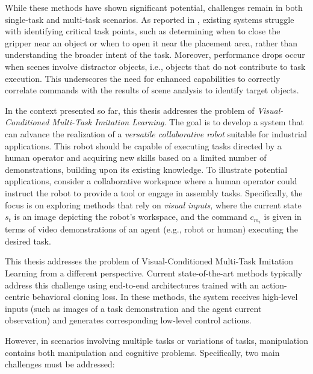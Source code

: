 While these methods have shown significant potential, challenges remain in both single-task and multi-task scenarios. As reported in \cite{jang2022bc_z, yu2018daml}, existing systems struggle with identifying critical task points, such as determining when to close the gripper near an object or when to open it near the placement area, rather than understanding the broader intent of the task. Moreover, performance drops occur when scenes involve distractor objects, i.e., objects that do not contribute to task execution. This underscores the need for enhanced capabilities to correctly correlate commands with the results of scene analysis to identify target objects.

In the context presented so far, this thesis addresses the problem of \textit{Visual-Conditioned Multi-Task Imitation Learning}. The goal is to develop a system that can advance the realization of a \textit{versatile collaborative robot} suitable for industrial applications. This robot should be capable of executing tasks directed by a human operator and acquiring new skills based on a limited number of demonstrations, building upon its existing knowledge. To illustrate potential applications, consider a collaborative workspace where a human operator could instruct the robot to provide a tool or engage in assembly tasks. Specifically, the focus is on exploring methods that rely on \textit{visual inputs}, where the current state $s_{t}$ is an image depicting the robot's workspace, and the command $c_{m_{i}}$ is given in terms of video demonstrations of an agent (e.g., robot or human) executing the desired task.

This thesis addresses the problem of Visual-Conditioned Multi-Task Imitation Learning from a different perspective. Current state-of-the-art methods typically address this challenge using end-to-end architectures trained with an action-centric behavioral cloning loss. In these methods, the system receives high-level inputs (such as images of a task demonstration and the agent current observation) and generates corresponding low-level control actions.

However, in scenarios involving multiple tasks or variations of tasks, manipulation contains both manipulation and cognitive problems. Specifically, two main challenges must be addressed:

